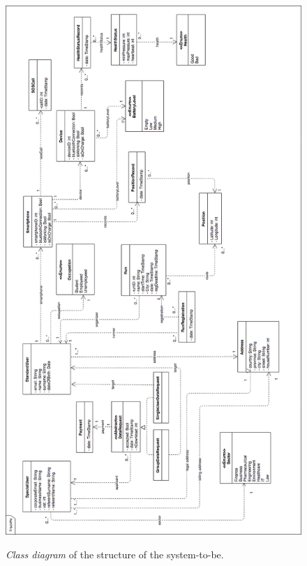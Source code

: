 \begin{figure}[H]
  \begin{center}
  	\includegraphics[height=0.68\paperheight]{./img/Class_Diagram.png}
		\caption{\textit{Class diagram} of the structure of the system-to-be.}
    \hspace{0.05\linewidth}
    \centering
		\label{classDiagram}
    \end{center}
\end{figure}
